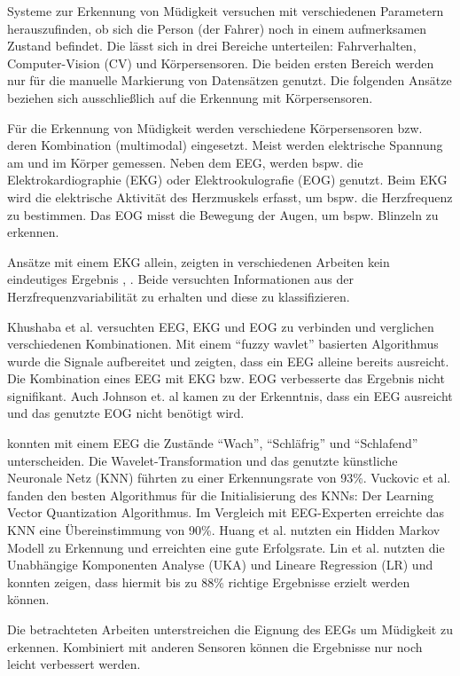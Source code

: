 \label{chap:state}
Systeme zur Erkennung von Müdigkeit versuchen mit verschiedenen Parametern herauszufinden, ob sich die Person (der Fahrer) noch in einem aufmerksamen Zustand befindet. Die lässt sich in drei Bereiche unterteilen: Fahrverhalten, Computer-Vision (CV) und Körpersensoren. Die beiden ersten Bereich werden nur für die manuelle Markierung von Datensätzen genutzt. Die folgenden Ansätze beziehen sich ausschließlich auf die Erkennung mit Körpersensoren.

Für die Erkennung von Müdigkeit werden verschiedene Körpersensoren bzw. deren Kombination (multimodal) eingesetzt. Meist werden elektrische Spannung am und im Körper gemessen. 
Neben dem EEG, werden bspw. die Elektrokardiographie (EKG) oder Elektrookulografie (EOG) genutzt. Beim EKG wird die elektrische Aktivität des Herzmuskels erfasst, um bspw. die  Herzfrequenz zu bestimmen. Das EOG misst die Bewegung der Augen, um bspw. Blinzeln zu erkennen.

Ansätze mit einem EKG allein, zeigten in verschiedenen Arbeiten kein eindeutiges Ergebnis \cite{Vicente_6164509}, \cite{Rogado_4913155}. Beide versuchten Informationen aus der Herzfrequenzvariabilität zu erhalten und diese zu klassifizieren.

Khushaba et al. \cite{Khushaba_5580017} versuchten EEG, EKG und EOG zu verbinden und verglichen verschiedenen Kombinationen. Mit einem "`fuzzy wavlet"' basierten Algorithmus wurde die Signale aufbereitet und zeigten, dass ein EEG alleine bereits ausreicht. Die Kombination eines EEG mit EKG bzw. EOG verbesserte das Ergebnis nicht signifikant. Auch Johnson et. al \cite{Johnson11} kamen zu der Erkenntnis, dass ein EEG ausreicht und das genutzte EOG nicht benötigt wird. 

\cite{Subasi:2005:ARA:1707423.1707550} konnten mit einem EEG die Zustände "`Wach"', "`Schläfrig"' und "`Schlafend"' unterscheiden. Die Wavelet-Transformation und das genutzte künstliche Neuronale Netz (KNN) führten zu einer Erkennungsrate von 93\%. Vuckovic et al. fanden den besten Algorithmus für die Initialisierung des KNNs: Der Learning Vector Quantization Algorithmus. Im Vergleich mit EEG-Experten erreichte das KNN eine Übereinstimmung von 90\%. Huang et al. \cite{Huang_548971} nutzten ein Hidden Markov Modell zu Erkennung und erreichten eine gute Erfolgsrate.
Lin et al. \cite{Lin05eeg-baseddrowsiness} nutzten die Unabhängige Komponenten Analyse (UKA) und Lineare Regression (LR) und konnten zeigen, dass hiermit  bis zu 88\% richtige Ergebnisse erzielt werden können. 

Die betrachteten Arbeiten unterstreichen die Eignung des EEGs um Müdigkeit zu erkennen. Kombiniert mit anderen Sensoren können die Ergebnisse nur noch leicht verbessert werden.